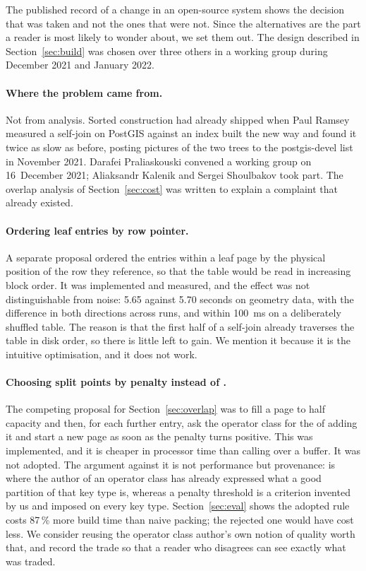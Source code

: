 The published record of a change in an open-source system shows the decision
that was taken and not the ones that were not. Since the alternatives are the
part a reader is most likely to wonder about, we set them out. The design
described in Section~\ref{sec:build} was chosen over three others in a working
group during December 2021 and January 2022.

\paragraph{Where the problem came from.} Not from analysis. Sorted construction
had already shipped when Paul Ramsey measured a self-join on PostGIS against an
index built the new way and found it twice as slow as before, posting pictures
of the two trees to the postgis-devel list in November 2021. Darafei
Praliaskouski convened a working group on 16~December 2021; Aliaksandr Kalenik
and Sergei Shoulbakov took part. The overlap analysis of Section~\ref{sec:cost}
was written to explain a complaint that already existed.

\paragraph{Ordering leaf entries by row pointer.} A separate proposal ordered the
entries within a leaf page by the physical position of the row they reference, so
that the table would be read in increasing block order. It was implemented and
measured, and the effect was not distinguishable from noise: 5.65 against 5.70
seconds on geometry data, with the difference in both directions across runs, and
within 100~ms on a deliberately shuffled table. The reason is that the first half
of a self-join already traverses the table in disk order, so there is little left
to gain. We mention it because it is the intuitive optimisation, and it does not
work.

\paragraph{Choosing split points by penalty instead of .} The
competing proposal for Section~\ref{sec:overlap} was to fill a page to half
capacity and then, for each further entry, ask the operator class for the
 of adding it and start a new page as soon as the penalty turns
positive. This was implemented, and it is cheaper in processor time than calling
 over a buffer. It was not adopted. The argument against it is
not performance but provenance:  is where the author of an
operator class has already expressed what a good partition of that key type is,
whereas a penalty threshold is a criterion invented by us and imposed on every
key type. Section~\ref{sec:eval} shows the adopted rule costs 87\,\% more build
time than naive packing; the rejected one would have cost less. We consider
reusing the operator class author's own notion of quality worth that, and record
the trade so that a reader who disagrees can see exactly what was traded.

